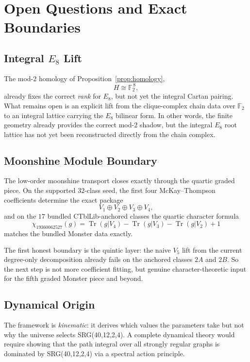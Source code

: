 \documentclass[12pt,a4paper]{article}
\begin{document}
\section{Open Questions and Exact Boundaries}
\label{sec:open}

\subsection{Integral $E_8$ Lift}
\label{sec:e8-lift-open}

The mod-$2$ homology of Proposition~\ref{prop:homology},
\[
  H \cong \mathbb{F}_2^{\,8},
\]
already fixes the correct \emph{rank} for $E_8$, but not yet the
integral Cartan pairing.  What remains open is an explicit lift from
the clique-complex chain data over $\mathbb{F}_2$ to an integral
lattice carrying the $E_8$ bilinear form.  In other words, the finite
geometry already provides the correct mod-$2$ shadow, but the
integral $E_8$ root lattice has not yet been reconstructed directly
from the chain complex.

\subsection{Moonshine Module Boundary}
\label{sec:moonshine-boundary}

The low-order moonshine transport closes exactly through the quartic
graded piece.  On the supported $32$-class seed, the first four
McKay--Thompson coefficients determine the exact package
\[
  V_1 \oplus V_2 \oplus V_3 \oplus V_4,
\]
and on the $17$ bundled CTblLib-anchored classes the quartic character
formula
\[
  \chi_{19360062527}(g)
  = \operatorname{Tr}(g|V_4)
    - \operatorname{Tr}(g|V_3)
    - \operatorname{Tr}(g|V_2) + 1
\]
matches the bundled Monster data exactly.

The first honest boundary is the quintic layer: the naive $V_5$ lift
from the current degree-only decomposition already fails on the
anchored classes $2A$ and $2B$.  So the next step is not more
coefficient fitting, but genuine character-theoretic input for the
fifth graded Monster piece and beyond.

\subsection{Dynamical Origin}

The framework is \emph{kinematic}: it derives which values the
parameters take but not why the universe selects SRG(40,12,2,4).
A complete dynamical theory would require showing that the path
integral over all strongly regular graphs is dominated by
SRG(40,12,2,4) via a spectral action principle.
\end{document}
